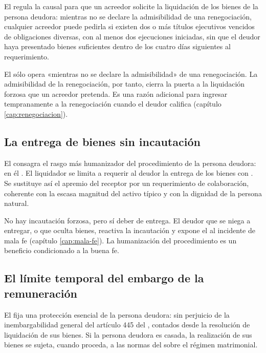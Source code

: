 El  regula la causal para que un acreedor solicite la liquidación de los bienes de
la persona deudora: mientras no se declare la admisibilidad de una renegociación, cualquier
acreedor puede pedirla si existen dos o más títulos ejecutivos vencidos de obligaciones
diversas, con al menos dos ejecuciones iniciadas, sin que el deudor haya presentado bienes
suficientes dentro de los cuatro días siguientes al requerimiento.

\begin{foco}
El  sólo opera «mientras no se declare la admisibilidad» de una renegociación. La
admisibilidad de la renegociación, por tanto, cierra la puerta a la liquidación forzosa que
un acreedor pretenda. Es una razón adicional para ingresar tempranamente a la renegociación
cuando el deudor califica (capítulo \ref{cap:renegociacion}).
\end{foco}

\subsection{La entrega de bienes sin incautación}

El  consagra el rasgo más humanizador del procedimiento de la persona deudora: en él
. El liquidador se limita a requerir al
deudor la entrega de los bienes con . Se sustituye
así el apremio del receptor por un requerimiento de colaboración, coherente con la escasa
magnitud del activo típico y con la dignidad de la persona natural.

\begin{foco}
No hay incautación forzosa, pero sí deber de entrega. El deudor que se niega a entregar, o que
oculta bienes, reactiva la incautación y expone el \discharge{} al incidente de mala fe
(capítulo \ref{cap:mala-fe}). La humanización del procedimiento es un beneficio condicionado a
la buena fe.
\end{foco}

\subsection{El límite temporal del embargo de la remuneración}

El  fija una protección esencial de la persona deudora: sin perjuicio de la
inembargabilidad general del artículo 445  del \cpc{},  contados desde la resolución de
liquidación de sus bienes. Si la persona deudora es casada, la realización de sus bienes se
sujeta, cuando proceda, a las normas del \cc{} sobre el régimen matrimonial.

